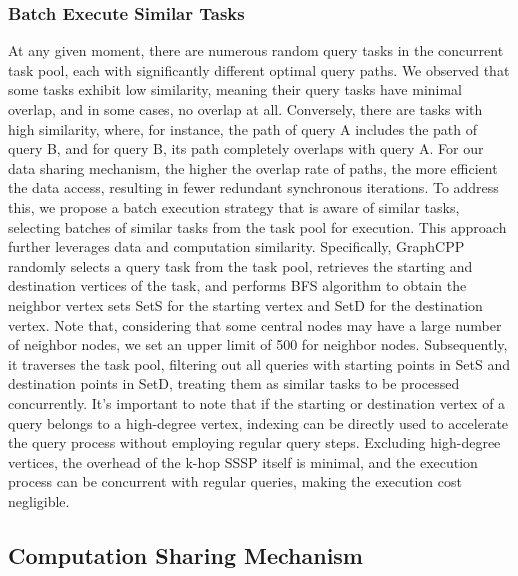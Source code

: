 \documentclass[lettersize,journal]{IEEEtran} %
\begin{document}
\subsubsection{Batch Execute Similar Tasks}

At any given moment, there are numerous random query tasks in the concurrent task pool, each with significantly different optimal query paths. We observed that some tasks exhibit low similarity, meaning their query tasks have minimal overlap, and in some cases, no overlap at all. Conversely, there are tasks with high similarity, where, for instance, the path of query A includes the path of query B, and for query B, its path completely overlaps with query A. For our data sharing mechanism, the higher the overlap rate of paths, the more efficient the data access, resulting in fewer redundant synchronous iterations. To address this, we propose a batch execution strategy that is aware of similar tasks, selecting batches of similar tasks from the task pool for execution. This approach further leverages data and computation similarity. Specifically, GraphCPP randomly selects a query task from the task pool, retrieves the starting and destination vertices of the task, and performs BFS algorithm to obtain the neighbor vertex sets SetS for the starting vertex and SetD for the destination vertex. Note that, considering that some central nodes may have a large number of neighbor nodes, we set an upper limit of 500 for neighbor nodes. Subsequently, it traverses the task pool, filtering out all queries with starting points in SetS and destination points in SetD, treating them as similar tasks to be processed concurrently. It's important to note that if the starting or destination vertex of a query belongs to a high-degree vertex, indexing can be directly used to accelerate the query process without employing regular query steps. Excluding high-degree vertices, the overhead of the k-hop SSSP itself is minimal, and the execution process can be concurrent with regular queries, making the execution cost negligible.


\subsection{Computation Sharing Mechanism}
\end{document}
